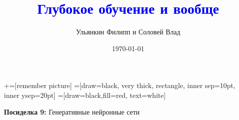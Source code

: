 \documentclass[notes,12pt, aspectratio=169]{beamer}
\title[]{\textcolor{blue}{Глубокое обучение и вообще}}
\author{Ульянкин Филипп и Соловей Влад}
\date{\today}
\begin{document}
\newcommand\marktopleft[1]{%
    \tikz[overlay,remember picture] 
        \node (marker-#1-a) at (-.3em,.3em) {};%
}
\newcommand\markbottomright[2]{%
    \tikz[overlay,remember picture] 
        \node (marker-#1-b) at (0em,0em) {};%
}
+=[remember picture] 
 =[draw=black, very thick, rectangle, inner sep=10pt, inner ysep=20pt]
 =[draw=black,fill=red, text=white]

\begin{frame}
\maketitle
\centering \textbf{\color{blue} Посиделка 9:}  Генеративные нейронные сети
\end{frame}
\end{document}
